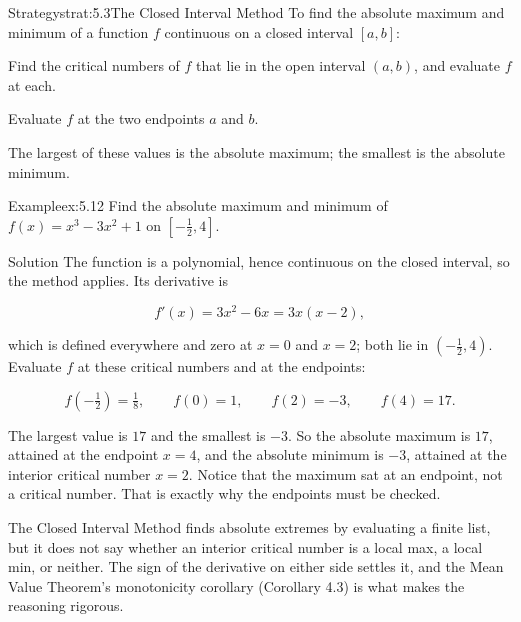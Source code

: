\documentclass[a4paper,12pt,oneside]{memoir}
\begin{document}
\begin{envstrategy}{Strategy}{strat:5.3}{The Closed Interval Method}
To find the absolute maximum and minimum of a function \(f\) continuous on a closed interval \([a, b]\):

\begin{steps}
  \item Find the critical numbers of \(f\) that lie in the open interval \((a, b)\), and evaluate \(f\) at each.
  \item Evaluate \(f\) at the two endpoints \(a\) and \(b\).
  \item The largest of these values is the absolute maximum; the smallest is the absolute minimum.
\end{steps}
\end{envstrategy}
\begin{workedexample}
\begin{envexample}{Example}{ex:5.12}{}
Find the absolute maximum and minimum of \(f(x) = x^{3} - 3x^{2} + 1\) on \([-\tfrac{1}{2}, 4]\).
\end{envexample}
\begin{envsolution}{Solution}{}{}
The function is a polynomial, hence continuous on the closed interval, so the method applies. Its derivative is

\[ f'(x) = 3x^{2} - 6x = 3x(x - 2), \]

which is defined everywhere and zero at \(x = 0\) and \(x = 2\); both lie in \((-\tfrac{1}{2}, 4)\). Evaluate \(f\) at these critical numbers and at the endpoints:

\[ f(-\tfrac{1}{2}) = \tfrac{1}{8}, \qquad f(0) = 1, \qquad f(2) = -3, \qquad f(4) = 17. \]

The largest value is \(17\) and the smallest is \(-3\). So the absolute maximum is \(17\), attained at the endpoint \(x = 4\), and the absolute minimum is \(-3\), attained at the interior critical number \(x = 2\). Notice that the maximum sat at an endpoint, not a critical number. That is exactly why the endpoints must be checked. \qedmark
\end{envsolution}
\end{workedexample}
The Closed Interval Method finds absolute extremes by evaluating a finite list, but it does not say whether an interior critical number is a local max, a local min, or neither. The sign of the derivative on either side settles it, and the Mean Value Theorem’s monotonicity corollary (Corollary 4.3) is what makes the reasoning rigorous.
\end{document}
